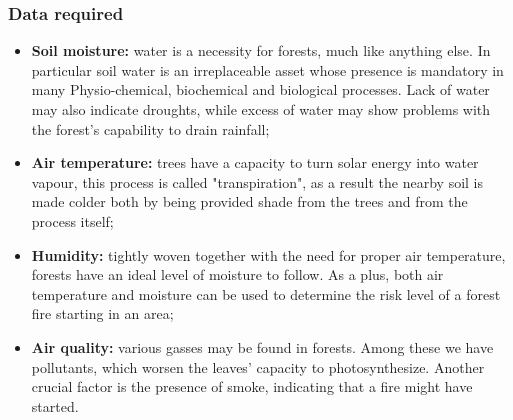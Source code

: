 \documentclass[11pt]{article}
\begin{document}
\subsubsection{Data required}
\begin{itemize}
    \item \textbf{Soil moisture:} water is a necessity for forests, much like anything else. In particular soil water is an irreplaceable asset whose presence is mandatory in many Physio-chemical, biochemical and biological processes. Lack of water may also indicate droughts, while excess of water may show problems with the forest's capability to drain rainfall;
    \item \textbf{Air temperature:} trees have a capacity to turn solar energy into water vapour, this process is called "transpiration", as a result the nearby soil is made colder both by being provided shade from the trees and from the process itself;
    \item \textbf{Humidity:} tightly woven together with the need for proper air temperature, forests have an ideal level of moisture to follow. As a plus, both air temperature and moisture can be used to determine the risk level of a forest fire starting in an area; 
    \item \textbf{Air quality:} various gasses may be found in forests. Among these we have pollutants, which worsen the leaves' capacity to photosynthesize. Another crucial factor is the presence of smoke, indicating that a fire might have started.
\end{itemize}
\end{document}
